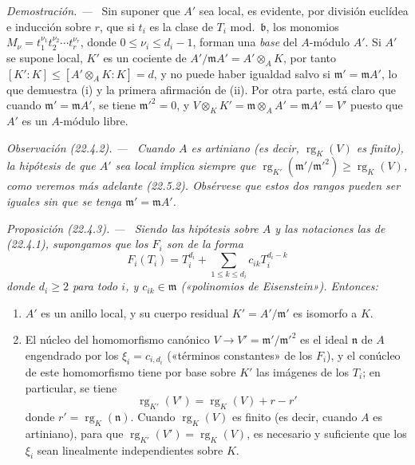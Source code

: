 \documentclass[10pt,oneside]{book}
\makeatletter
\newcommand{\setmanualcurrentlabel}[1]{\def\@currentlabel{#1}}
\newcommand{\oldpage}[2][]{%
  \setcounter{footnote}{0}%
  \marginpar{\scriptsize\textbf{#1}~|~#2}\ignorespaces}
\newenvironment{proposition}[1][]{%
  \setmanualcurrentlabel{#1}\par\medskip\noindent\itshape Proposición (#1). ---\ }{\par}
\newenvironment{remark}[1][]{%
  \setmanualcurrentlabel{#1}\par\medskip\noindent\itshape Observación (#1). ---\ }{\par}
\newenvironment{proof}{%
  \par\medskip\noindent\textit{Demostración. ---\ }}{\par}
\providecommand{\setmin}{-}%
\makeatother
\begin{document}
\begin{proof}
Sin suponer que $A'$ sea local, es evidente, por división euclídea e
inducción sobre $r$, que si $t_i$ es la clase de $T_i$ mod.~$\mathfrak b$,
los monomios
$M_\nu=t_1^{\nu_1}t_2^{\nu_2}\cdots t_r^{\nu_r}$, donde
$0\leqslant\nu_i\leqslant d_i\setmin 1$, forman una \emph{base} del $A$-módulo $A'$. Si
$A'$ se supone local, $K'$ es un cociente de
$A'/\mathfrak mA'=A'\otimes_AK$, por tanto
$[K':K]\leqslant[A'\otimes_AK:K]=d$, y no puede haber igualdad salvo si
$\mathfrak m'=\mathfrak mA'$, lo que demuestra (i) y la primera afirmación
de (ii). Por otra parte, está claro que cuando
$\mathfrak m'=\mathfrak mA'$, se tiene $\mathfrak m'^2=0$, y
$V\otimes_KK'=\mathfrak m\otimes_AA'=\mathfrak mA'=V'$ puesto que $A'$ es
un $A$-módulo libre.
\end{proof}

\begin{remark}[22.4.2]
\label{0.22.4.2-es}
Cuando $A$ es artiniano (es decir, $\operatorname{rg}_K(V)$ es finito),
la hipótesis de que $A'$ sea local implica siempre que
$\operatorname{rg}_{K'}(\mathfrak m'/\mathfrak m'^2)
\geqslant\operatorname{rg}_K(V)$, como veremos más adelante (22.5.2).
Obsérvese que estos dos rangos pueden ser iguales sin que se tenga
$\mathfrak m'=\mathfrak mA'$.
\end{remark}

\begin{proposition}[22.4.3]
\label{0.22.4.3-es}
Siendo las hipótesis sobre $A$ y las notaciones las de \textup{(22.4.1)}, supongamos
que los $F_i$ son de la forma
\begin{equation}
\label{0.22.4.3.1-es}
  F_i(T_i)=T_i^{d_i}+\sum_{1\leqslant k\leqslant d_i}
  c_{ik}T_i^{d_i-k}
  \tag{22.4.3.1}
\end{equation}
donde $d_i\geqslant2$ para todo $i$, y $c_{ik}\in\mathfrak m$
(«polinomios de Eisenstein»). Entonces:
\begin{enumerate}
  \item[\textup{(i)}] $A'$ es un anillo local, y su cuerpo residual
  $K'=A'/\mathfrak m'$ es isomorfo a $K$.

  \oldpage[0\textsubscript{IV-1}]{194}

  \item[\textup{(ii)}] El núcleo del homomorfismo canónico
  $V\to V'=\mathfrak m'/\mathfrak m'^2$ es el ideal $\mathfrak n$ de $A$
  engendrado por los $\xi_i=c_{i,d_i}$ («términos constantes» de los $F_i$), y
  el conúcleo de este homomorfismo tiene por base sobre $K'$ las imágenes de los $T_i$;
  en particular, se tiene
  \begin{equation}
  \label{0.22.4.3.2-es}
    \operatorname{rg}_{K'}(V')=\operatorname{rg}_K(V)+r\setmin r'
    \tag{22.4.3.2}
  \end{equation}
  donde $r'=\operatorname{rg}_K(\mathfrak n)$. Cuando
  $\operatorname{rg}_K(V)$ es finito (es decir, cuando $A$ es
  artiniano), para que
  $\operatorname{rg}_{K'}(V')=\operatorname{rg}_K(V)$, es necesario y suficiente
  que los $\xi_i$ sean linealmente independientes sobre $K$.
\end{enumerate}
\end{proposition}
\end{document}
